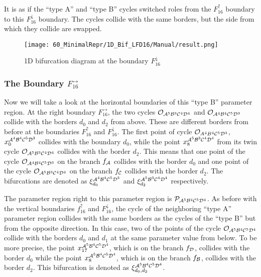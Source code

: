 It is as if the ``type A'' and ``type B'' cycles switched roles from the $F_{16}^\uparrow$ boundary to this $F_{16}^\downarrow$ boundary.
The cycles collide with the same borders, but the side from which they collide are swapped.

\begin{figure}
	\centering
	\texttt{[image: 60\_MinimalRepr/1D\_Bif\_LFD16/Manual/result.png]}
	\label{fig:final.bifurcation.F.down}
	\caption{1D bifurcation diagram at the boundary $F_{16}^\downarrow$}
\end{figure}

\subsubsection{The Boundary $F_{16}^\rightarrow$}
\label{sec:minrep.bif.R}

Now we will take a look at the horizontal boundaries of this ``type B'' parameter region.
At the right boundary $F_{16}^\rightarrow$, the two cycles $\mathcal{O}_{\mathcal{A}^5\mathcal{B}^3\mathcal{C}^4\mathcal{D}^4}$ and $\mathcal{O}_{\mathcal{A}^4\mathcal{B}^4\mathcal{C}^5\mathcal{D}^3}$ collide with the borders $d_0$ and $d_2$ from above.
These are different borders from before at the boundaries $F_{16}^\uparrow$ and $F_{16}^\downarrow$.
The first point of cycle $\mathcal{O}_{A^4B^4\mathcal{C}^5\mathcal{D}^3}$, $x_{0}^{\mathcal{A}^4\mathcal{B}^4\mathcal{C}^5\mathcal{D}^3}$ collides with the boundary $d_0$, while the point $x_{8}^{\mathcal{A}^5\mathcal{B}^3\mathcal{C}^4\mathcal{D}^4}$ from its twin cycle $\mathcal{O}_{\mathcal{A}^5\mathcal{B}^3\mathcal{C}^4\mathcal{D}^4}$ collides with the border $d_2$.
This means that one point of the cycle $\mathcal{O}_{\mathcal{A}^4\mathcal{B}^4\mathcal{C}^5\mathcal{D}^3}$ on the branch $f_{\mathcal{A}}$ collides with the border $d_0$ and one point of the cycle $\mathcal{O}_{\mathcal{A}^5\mathcal{B}^3\mathcal{C}^4\mathcal{D}^4}$ on the branch $f_{\mathcal{C}}$ collides with the border $d_2$.
The bifurcations are denoted as $\xi_{d_0}^{\mathcal{A}^4\mathcal{B}^4\mathcal{C}^5\mathcal{D}^3}$ and $\xi_{d_2}^{\mathcal{A}^5\mathcal{B}^3\mathcal{C}^4\mathcal{D}^4}$ respectively.

The parameter region right to this parameter region is $\mathcal{P}_{\mathcal{A}^5\mathcal{B}^4\mathcal{C}^5\mathcal{D}^4}$.
As before with the vertical boundaries $f_{16}^\uparrow$ and $F_{16}^\downarrow$, the cycle of the neighboring ``type A'' parameter region collides with the same borders as the cycles of the ``type B'' but from the opposite direction.
In this case, two of the points of the cycle $\mathcal{O}_{\mathcal{A}^5\mathcal{B}^4\mathcal{C}^5\mathcal{D}^4}$ collide with the borders $d_0$ and $d_1$ at the same parameter value from below.
To be more precise, the point $x_{17}^{\mathcal{A}^5\mathcal{B}^4\mathcal{C}^5\mathcal{D}^4}$, which is on the branch $f_{\mathcal{D}}$, collides with the border $d_0$ while the point $x_{8}^{\mathcal{A}^5\mathcal{B}^4\mathcal{C}^5\mathcal{D}^4}$, which is on the branch $f_{\mathcal{B}}$, collides with the border $d_2$.
This bifurcation is denoted as $\xi_{d_0, d_2}^{\mathcal{A}^5\mathcal{B}^4\mathcal{C}^5\mathcal{D}^4}$.

